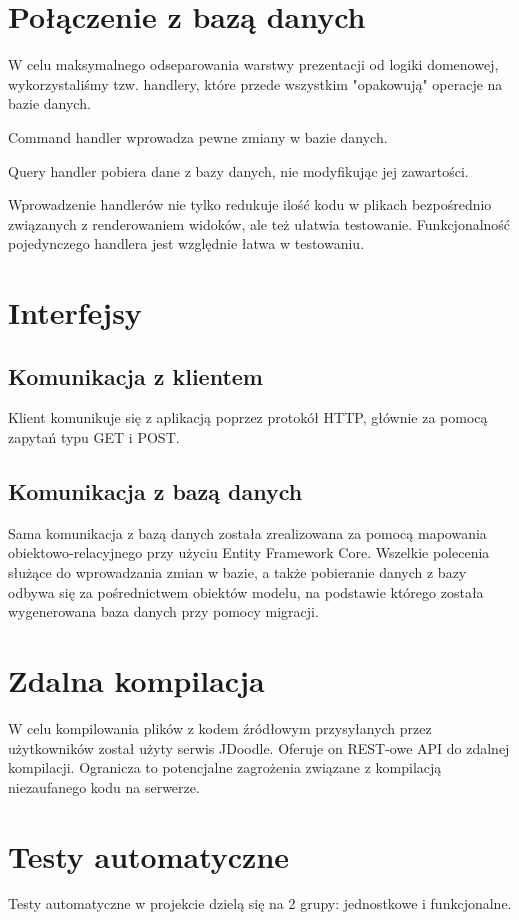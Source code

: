 \documentclass{article}
\begin{document}
\section{Połączenie z bazą danych}
W celu maksymalnego odseparowania warstwy prezentacji od logiki domenowej, wykorzystaliśmy tzw. handlery, które przede wszystkim "opakowują" operacje na bazie danych.

Command handler wprowadza pewne zmiany w bazie danych.

Query handler pobiera dane z bazy danych, nie modyfikując jej zawartości.

Wprowadzenie handlerów nie tylko redukuje ilość kodu w plikach bezpośrednio związanych z renderowaniem widoków, ale też ułatwia testowanie. Funkcjonalność pojedynczego handlera jest względnie łatwa w testowaniu.

\section{Interfejsy}
\subsection{Komunikacja z klientem}
Klient komunikuje się z aplikacją poprzez protokół HTTP, głównie za pomocą zapytań typu GET i POST. 

\subsection{Komunikacja z bazą danych}
Sama komunikacja z bazą danych została zrealizowana za pomocą mapowania obiektowo-relacyjnego przy użyciu Entity Framework Core. Wszelkie polecenia służące do wprowadzania zmian w bazie, a także pobieranie danych z bazy odbywa się za pośrednictwem obiektów modelu, na podstawie którego została wygenerowana baza danych przy pomocy migracji.

\section{Zdalna kompilacja}
W celu kompilowania plików z kodem źródłowym przysyłanych przez użytkowników został użyty serwis JDoodle. Oferuje on REST-owe API do zdalnej kompilacji. Ogranicza to potencjalne zagrożenia związane z kompilacją niezaufanego kodu na serwerze.

\section{Testy automatyczne}
Testy automatyczne w projekcie dzielą się na 2 grupy: jednostkowe i funkcjonalne.
\end{document}
